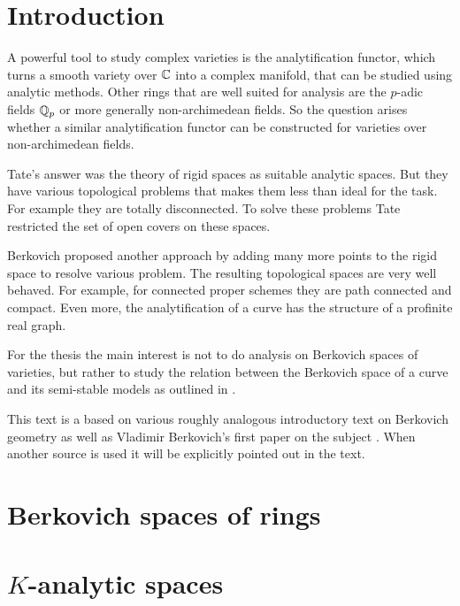 \section{Introduction} \label{sec:introduction}

A powerful tool to study complex varieties is the analytification functor, which turns a  smooth variety over $\mathbb{C}$ into a complex manifold, that can be studied using analytic methods. 
Other rings that are well suited for analysis are the $p$-adic fields $\mathbb{Q}_p$ or more generally non-archimedean fields. 
So the question arises whether a similar analytification functor can be constructed for  varieties over non-archimedean fields. 

Tate's answer was the theory of rigid spaces as suitable analytic spaces. 
But they have various topological problems that makes them less than ideal for the task. 
For example they are totally disconnected. To solve these problems Tate restricted the set of open covers on these spaces. 

Berkovich proposed another approach by adding many more points to the rigid space to resolve various problem. 
The resulting topological spaces are very well behaved. 
For example, for connected proper schemes they are path connected and compact. 
Even more, the analytification of a curve has the structure of a profinite real graph. 

For the thesis the main interest is not to do analysis on Berkovich spaces of varieties, but rather to study the relation between the Berkovich space of a curve and its semi-stable models as outlined in \cite{bakerStructureNonarchimedeanAnalytic2013}.

This text is a based on various roughly analogous introductory text on Berkovich geometry \cite{bakerarizona,temkinIntroductionBerkovichAnalytic2010,nicaiseNonarchimedeanGeometry2017,boschLecturesFormalRigid2014, wojciechwawrowBerkovicSpaces2020} as well as Vladimir Berkovich's first paper on the subject \cite{berkovichSpectralTheoryAnalytic2012}.
When another source is used it will be explicitly pointed out in the text. 


\section{Berkovich spaces of rings} \label{sec:berkovich_spaces}



\section{$K$-analytic spaces} \label{sec:K_analytic_spaces}



